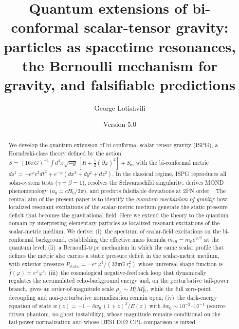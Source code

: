 \documentclass[aps,prd,onecolumn,superscriptaddress,nofootinbib,showpacs,12pt,notitlepage]{revtex4-2}
\newcommand{\Mpl}{M_{\mathrm{Pl}}}
\newcommand{\rs}{r_{\mathrm{s}}}
\newcommand{\meff}{m_{\mathrm{eff}}}
\begin{document}
\title{Quantum extensions of bi-conformal scalar-tensor gravity:
  particles as spacetime resonances, the Bernoulli mechanism
  for gravity, and falsifiable predictions}

\author{George Lotishvili}

\date{Version 5.0}

\begin{abstract}
\setlength{\leftskip}{0pt}\setlength{\rightskip}{0pt}%
\linespread{1.0}\selectfont\small
We develop the quantum extension of bi-conformal scalar-tensor gravity
(ISPG), a Horndeski-class theory defined by the action
$S = (16\pi G)^{-1}\!\int\! d^4x\sqrt{-g}\,[R + \frac{1}{2}(\partial\varphi)^2]
+ S_{\mathrm{m}}$ with the bi-conformal metric
$ds^2 = -e^\varphi c^2 dt^2 + e^{-\varphi}(dx^2+dy^2+dz^2)$.
In the classical regime, ISPG reproduces all solar-system tests
($\gamma=\beta=1$), resolves the Schwarzschild singularity,
derives MOND phenomenology ($a_0 = cH_0/2\pi$), and predicts
falsifiable deviations at 2PN order~\cite{Lotishvili2026}.
The central aim of the present paper is to identify the
\emph{quantum mechanism of gravity}: how localized resonant
excitations of the scalar-metric medium generate the static pressure
deficit that becomes the gravitational field.  Here we extend the
theory to the quantum domain by interpreting
elementary particles as localized resonant excitations of the
scalar-metric medium.  We derive: (i)~the spectrum of scalar-field
excitations on the bi-conformal background, establishing the
effective mass formula $\meff = m_0 e^{\varphi/2}$ at the quantum
level; (ii)~a Bernoulli-type mechanism in which the same scalar
profile that defines the metric also carries a static pressure
deficit in the scalar-metric medium, with exterior pressure
$P_{\mathrm{static}} = -e^{\varphi}\varphi^4/(32\pi G\,\rs^2)$
whose universal shape function is $\hat{f}(\varphi) = e^{\varphi}\varphi^4$;
(iii)~the cosmological negative-feedback loop that dynamically
regulates the accumulated echo-background energy and, on the
perturbative tail-power branch, gives an order-of-magnitude scale
$\rho_\Lambda \sim H_0^2 \Mpl^2$, while the full zero-point
decoupling and non-perturbative normalization remain open; (iv)~the dark-energy equation of state
$w(z) = -1 - \delta w_0\,(1+z)^3/E(z)$ with
$\delta w_0 \sim 10^{-2}$--$10^{-1}$ (source-driven phantom,
no ghost instability), whose magnitude remains conditional on the
tail-power normalization and whose DESI DR2 CPL comparison is mixed

\end{abstract}
\end{document}
